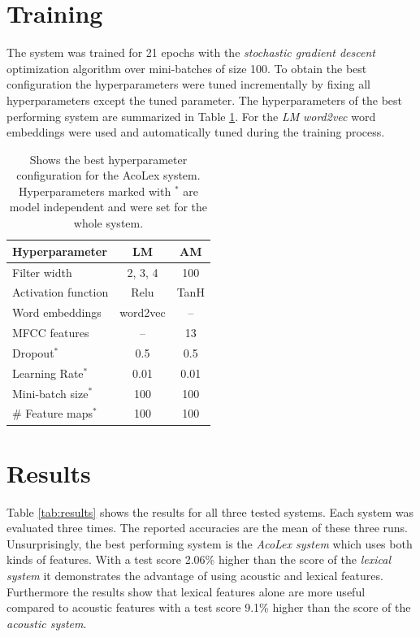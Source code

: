 \documentclass[11pt,a4paper]{article}
\begin{document}
\section{Training}
The system was trained for 21 epochs with the \textit{stochastic gradient descent} optimization algorithm over mini-batches of size 100. To obtain the best configuration the hyperparameters were tuned incrementally by fixing all hyperparameters except the tuned parameter. The hyperparameters of the best performing system are summarized in Table \ref{tab:hyperparameters}. For the \textit{LM} \textit{word2vec} \cite{word2vec} word embeddings were used and automatically tuned during the training process.

\begin{table}[h]
	\centering
	\begin{tabular}{ l | c | c}
		\textbf{Hyperparameter} & \textbf{LM} & \textbf{AM} \\
		\hline
		Filter width & 2, 3, 4 & 100 \\
		Activation function & Relu & TanH \\
		Word embeddings & word2vec & -- \\
		MFCC features & -- & 13 \\
		Dropout$^\ast$ & 0.5 & 0.5 \\
		Learning Rate$^\ast$ & 0.01 & 0.01 \\
		Mini-batch size$^\ast$ & 100 & 100 \\
		\# Feature maps$^\ast$ & 100 & 100 \\
	\end{tabular}
	\caption{Shows the best hyperparameter configuration for the AcoLex system. Hyperparameters marked with $^\ast$ are model independent and were set for the whole system.}
	\label{tab:hyperparameters}
\end{table}	

\section{Results}
Table \ref{tab:results} shows the results for all three tested systems. Each system was evaluated three times. The reported accuracies are the mean of these three runs. Unsurprisingly, the best performing system is the \textit{AcoLex system} which uses both kinds of features. With a test score 2.06\% higher than the score of the \textit{lexical system} it demonstrates the advantage of using acoustic and lexical features. Furthermore the results show that lexical features alone are more useful compared to acoustic features with a test score 9.1\% higher than the score of the \textit{acoustic system}.
\end{document}
